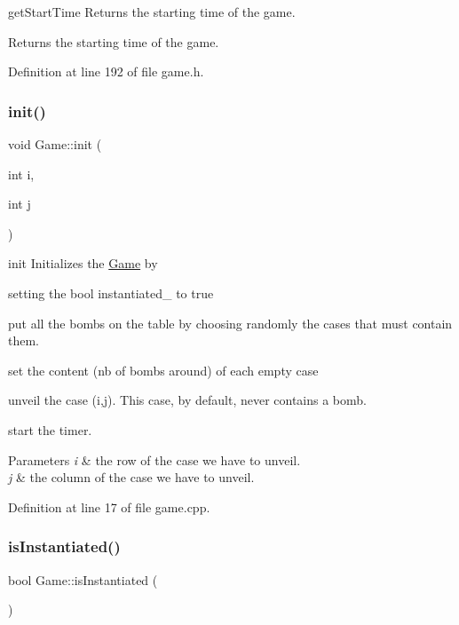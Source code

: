 get\+Start\+Time Returns the starting time of the game. 

\begin{DoxyReturn}{Returns}
the starting time of the game. 
\end{DoxyReturn}


Definition at line 192 of file game.\+h.

\mbox{\label{class_game_a1e71702da13cf28f77ab870b417a6866}} 
\subsubsection{\texorpdfstring{init()}{init()}}
{\footnotesize\ttfamily void Game\+::init (\begin{DoxyParamCaption}\item[{int}]{i,  }\item[{int}]{j }\end{DoxyParamCaption})}



init Initializes the \hyperlink{class_game}{Game} by 


\begin{DoxyItemize}
\item setting the bool instantiated\+\_\+ to true
\item put all the bombs on the table by choosing randomly the cases that must contain them.
\item set the content (nb of bombs around) of each empty case
\item unveil the case (i,j). This case, by default, never contains a bomb.
\item start the timer. 
\begin{DoxyParams}{Parameters}
{\em i} & the row of the case we have to unveil. \\
\hline
{\em j} & the column of the case we have to unveil. \\
\hline
\end{DoxyParams}

\end{DoxyItemize}

Definition at line 17 of file game.\+cpp.

\mbox{\label{class_game_a1cb2f9034bb550c3debfced46b945d11}} 
\subsubsection{\texorpdfstring{is\+Instantiated()}{isInstantiated()}}
{\footnotesize\ttfamily bool Game\+::is\+Instantiated (\begin{DoxyParamCaption}{ }\end{DoxyParamCaption})\hspace{0.3cm}{\ttfamily [inline]}}



